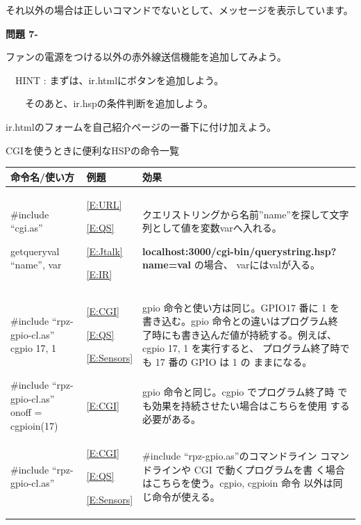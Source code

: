\documentclass[a4paper,12pt,dvipdfmx]{jarticle}
\newcounter{Question}
\renewcommand\theQuestion{\textbf{問題 7-\arabic{Question}}}
\begin{document}
それ以外の場合は正しいコマンドでないとして、メッセージを表示しています。


\bigskip

\bigskip
{}\theQuestion

ファンの電源をつける以外の赤外線送信機能を追加してみよう。

\ \ HINT :
まずは、ir.htmlにボタンを追加しよう。

\ \ \ \ そのあと、ir.hspの条件判断を追加しよう。

ir.htmlのフォームを自己紹介ページの一番下に付け加えよう。


\bigskip


\bigskip


\clearpage
CGIを使うときに便利なHSPの命令一覧

\begin{flushleft}
	\tablefirsthead{}
	\tablehead{}
	\tabletail{}
	\tablelasttail{}
	\begin{supertabular}{|m{5.467cm}|m{3.181cm}|m{7.7cm}|}
		\hline
		命令名/使い方 &
		例題 &
		効果\\\hline
		\#include “cgi.as”

		getqueryval “name”, var &
		\ref*{E:URL}

		\ref*{E:QS}

		\ref*{E:Jtalk}

		\ref*{E:IR} &
		クエリストリングから名前”name”を探して文字列として値を変数varへ入れる。

		\textbf{localhost:3000/cgi-bin/querystring.hsp?name=val}
		の場合、
		varにはvalが入る。\\\hline

		\#include “rpz-gpio-cl.as”
		cgpio 17, 1&
		\ref*{E:CGI}

		\ref*{E:QS}

		\ref*{E:Sensors} &
		gpio 命令と使い方は同じ。GPIO17 番に 1 を
		書き込む。gpio 命令との違いはプログラム終
		了時にも書き込んだ値が持続する。例えば、
		cgpio 17, 1 を実行すると、
		プログラム終了時でも 17 番の GPIO は 1 の
		ままになる。\\\hline

		\#include “rpz-gpio-cl.as”
		onoff = cgpioin(17)&
		\ref*{E:CGI} &
		gpio 命令と同じ。cgpio でプログラム終了時
		でも効果を持続させたい場合はこちらを使用
		する必要がある。\\\hline

		\#include “rpz-gpio-cl.as”&
		\ref*{E:CGI}

		\ref*{E:QS}

		\ref*{E:Sensors} &
		\#include “rpz-gpio.as”のコマンドライン
		コマンドラインや CGI で動くプログラムを書
		く場合はこちらを使う。cgpio, cgpioin 命令
		以外は同じ命令が使える。\\\hline


\end{supertabular}
\end{flushleft}
\end{document}
